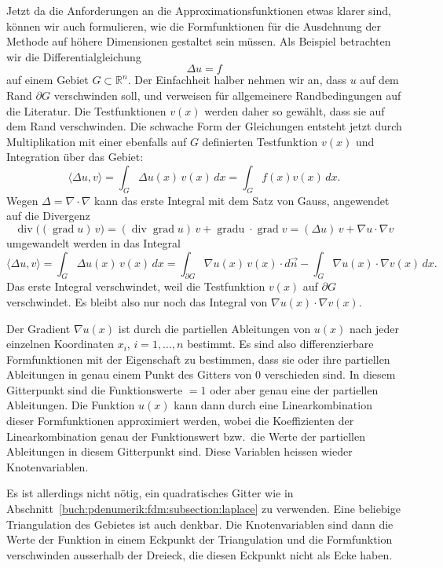 Jetzt da die Anforderungen an die Approximationsfunktionen etwas
klarer sind, können wir auch formulieren, wie die Formfunktionen
für die Ausdehnung der Methode auf höhere Dimensionen gestaltet sein
müssen.
Als Beispiel betrachten wir die Differentialgleichung 
\[
\Delta u = f
\]
auf einem Gebiet $G\subset\mathbb{R}^n$.
Der Einfachheit halber nehmen wir an, dass $u$ auf dem Rand $\partial G$
verschwinden soll, und verweisen für allgemeinere Randbedingungen auf
die Literatur.
Die Testfunktionen $v(x)$ werden daher so gewählt, dass sie auf dem
Rand verschwinden.
Die schwache Form der Gleichungen entsteht jetzt durch Multiplikation
mit einer ebenfalls auf $G$ definierten Testfunktion $v(x)$ und
Integration über das Gebiet:
\[
\langle \Delta u,v\rangle
=
\int_G \Delta u(x)\,v(x)\,dx
=
\int_G f(x) v(x)\,dx.
\]
Wegen $\Delta = \nabla\cdot\nabla$ kann das erste Integral mit
dem Satz von Gauss, angewendet auf die Divergenz 
\[
\operatorname{div} \bigl((\operatorname{grad} u )\, v\bigr)
=
(\operatorname{div}\operatorname{grad}u)\, v
+
\operatorname{grad u}\cdot\operatorname{grad}v
=
(\Delta u)\, v
+
\nabla u\cdot\nabla v
\]
umgewandelt werden in das Integral
\[
\langle \Delta u,v\rangle
=
\int_G \Delta u(x)\,v(x)\,dx
=
\int_{\partial G}
\nabla u(x)\, v(x)
\cdot d\vec{n}
-
\int_G
\nabla u(x)\cdot\nabla v(x)
\,dx.
\]
Das erste Integral verschwindet, weil die Testfunktion $v(x)$ auf
$\partial G$ verschwindet.
Es bleibt also nur noch das Integral von $\nabla u(x)\cdot\nabla v(x)$.

Der Gradient $\nabla u(x)$ ist durch die partiellen Ableitungen von $u(x)$
nach jeder einzelnen Koordinaten $x_i$, $i=1,\dots,n$ bestimmt.
Es sind also differenzierbare Formfunktionen mit der Eigenschaft
zu bestimmen, dass sie oder ihre partiellen Ableitungen in genau
einem Punkt des Gitters von $0$ verschieden sind.
In diesem Gitterpunkt sind die Funktionswerte $=1$ oder aber 
genau eine der partiellen Ableitungen.
Die Funktion $u(x)$ kann dann durch eine Linearkombination
dieser Formfunktionen approximiert werden, wobei die Koeffizienten
der Linearkombination genau der Funktionswert bzw.~die Werte
der partiellen Ableitungen in diesem Gitterpunkt sind.
Diese Variablen heissen wieder Knotenvariablen.

Es ist allerdings nicht nötig, ein quadratisches Gitter wie
in Abschnitt~\ref{buch:pdenumerik:fdm:subsection:laplace} zu verwenden.
Eine beliebige Triangulation des Gebietes ist auch denkbar.
Die Knotenvariablen sind dann die Werte der Funktion in einem Eckpunkt
der Triangulation und die Formfunktion verschwinden ausserhalb der Dreieck,
die diesen Eckpunkt nicht als Ecke haben.

